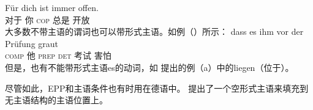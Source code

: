 \ex\label{ex-fuer-dich-ist-immer-offen}
\gll Für dich ist immer offen.\footnotemark\\
	 对于 你 \textsc{cop} 总是 开放\\
\zl
大多数不带主语的谓词也可以带形式主语。如例（）所示：
\ea
\gll dass es ihm vor der Prüfung graut\\
	 \textsc{comp} \expl{} 他 \textsc{prep} \textsc{det} 考试 害怕\\
\z
但是，也有不能带形式主语es的动词，如 \citet[]{Reis82}提出的例（a）中的liegen（位于）。

\eal
{}
\zl

\noindent
尽管如此，EPP和主语条件也有时用在德语中。 \citet[]{Grewendorf93}提出了一个空形式主语来填充到无主语结构的主语位置上。


